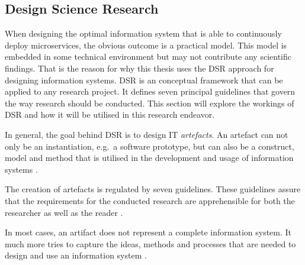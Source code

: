 
\subsection{Design Science Research}%
\label{sec:Design_Science_Research}

When designing the optimal information system that is able to continuously
deploy microservices, the obvious outcome is a practical model. This model is
embedded in some technical environment but may not contribute any scientific
findings. That is the reason for why this thesis uses the \ac{DSR} approach for
designing information systems. \ac{DSR} is an conceptual framework that can be
applied to any research project. It defines seven principal guidelines that
govern the way research should be conducted. This section will explore the
workings of \ac{DSR} and how it will be utilised in this research endeavor.

In general, the goal behind \ac{DSR} is to design \ac{IT} \textit{artefacts}.
An artefact can not only be an instantiation, e.g.\ a software prototype, but
can also be a construct, model and method that is utilised in the development
and usage of information systems \autocite[p.
82]{VonAlanDesignscienceinformation2004}.

The creation of artefacts is regulated by seven guidelines. These guidelines
assure that the requirements for the conducted research are apprehensible for
both the researcher as well as the reader \autocite[p.
82]{VonAlanDesignscienceinformation2004}.


In most cases, an artifact does not represent a complete information system. It
much more tries to capture the ideas, methods and processes that are needed to
design and use an information system \autocite[p.
83]{VonAlanDesignscienceinformation2004}.

